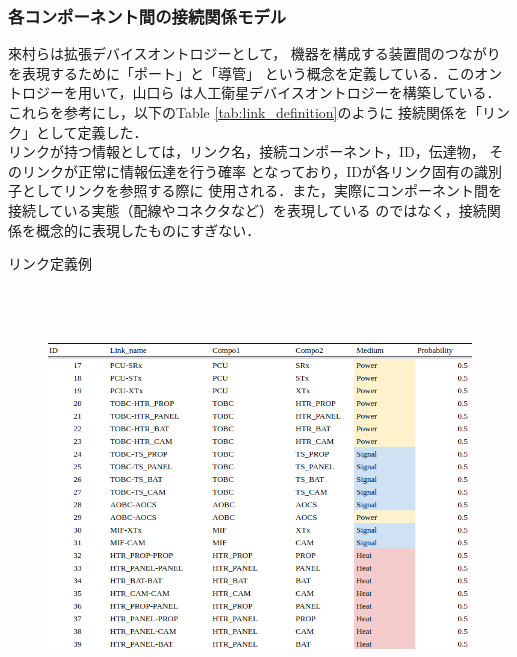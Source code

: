 \documentclass[11pt]{article}
\begin{document}
\subsubsection{各コンポーネント間の接続関係モデル}
來村ら\cite{Kitamura01}は拡張デバイスオントロジーとして，
機器を構成する装置間のつながりを表現するために「ポート」と「導管」%
という概念を定義している．このオントロジーを用いて，山口ら\cite{Yamaguchi2014}
は人工衛星デバイスオントロジーを構築している．
これらを参考にし，以下のTable \ref{tab:link_definition}のように
接続関係を「リンク」として定義した．\\%
リンクが持つ情報としては，リンク名，接続コンポーネント，ID，伝達物，
そのリンクが正常に情報伝達を行う確率%
となっており，IDが各リンク固有の識別子としてリンクを参照する際に
使用される．また，実際にコンポーネント間を接続している実態（配線やコネクタなど）を表現している
のではなく，接続関係を概念的に表現したものにすぎない．

\begin{table}[H]
   \centering
   \caption{リンク定義例}
   \label{tab:link_definition}
\end{table} 
\vspace{-2zh}
\begin{figure}[H]
   \centering
      \includegraphics[height=11cm]{figure/link_definition.png}
\end{figure}
\end{document}
